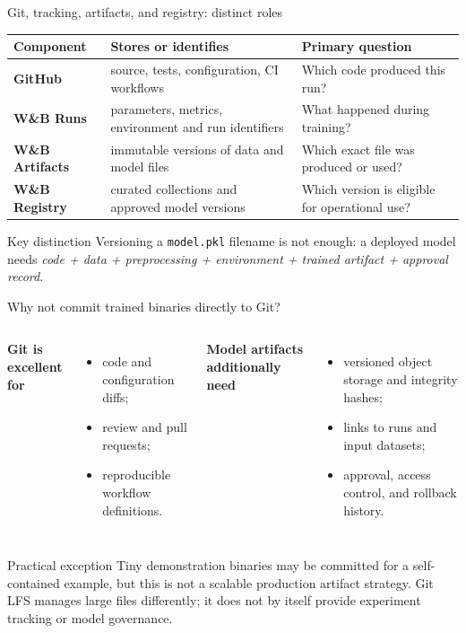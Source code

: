 
\begin{frame}{Git, tracking, artifacts, and registry: distinct roles}
\begingroup\footnotesize
\begin{tabularx}{\textwidth}{>{\bfseries}l X X}
Component & Stores or identifies & Primary question \\
\toprule
GitHub & source, tests, configuration, CI workflows & Which code produced this run? \\
W\&B Runs & parameters, metrics, environment and run identifiers & What happened during training? \\
W\&B Artifacts & immutable versions of data and model files & Which exact file was produced or used? \\
W\&B Registry & curated collections and approved model versions & Which version is eligible for operational use? \\
\bottomrule
\end{tabularx}
\par\endgroup
\vspace{0.6em}
\begin{block}{Key distinction}
\footnotesize Versioning a \texttt{model.pkl} filename is not enough: a deployed model needs \emph{code + data + preprocessing + environment + trained artifact + approval record}.
\end{block}
\coursefooter
\end{frame}

\begin{frame}{Why not commit trained binaries directly to Git?}
\begin{columns}[T]
\textbf{Git is excellent for}\begin{itemize}\footnotesize
\item code and configuration diffs;
\item review and pull requests;
\item reproducible workflow definitions.
\end{itemize}
\textbf{Model artifacts additionally need}\begin{itemize}\footnotesize
\item versioned object storage and integrity hashes;
\item links to runs and input datasets;
\item approval, access control, and rollback history.
\end{itemize}
\end{columns}
\vspace{0.5em}
\begin{block}{Practical exception}
\footnotesize Tiny demonstration binaries may be committed for a self-contained example, but this is not a scalable production artifact strategy. Git LFS manages large files differently; it does not by itself provide experiment tracking or model governance.
\end{block}
\coursefooter
\end{frame}


